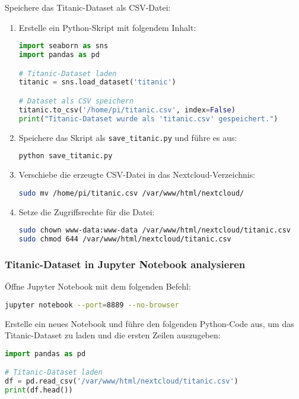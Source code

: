 \documentclass[a4paper,12pt]{article}
\begin{document}
Speichere das Titanic-Dataset als CSV-Datei:
\begin{enumerate}
    \item Erstelle ein Python-Skript mit folgendem Inhalt:
\begin{lstlisting}[language=Python]
import seaborn as sns
import pandas as pd

# Titanic-Dataset laden
titanic = sns.load_dataset('titanic')

# Dataset als CSV speichern
titanic.to_csv('/home/pi/titanic.csv', index=False)
print("Titanic-Dataset wurde als 'titanic.csv' gespeichert.")
\end{lstlisting}

    \item Speichere das Skript als \texttt{save\_titanic.py} und führe es aus:
\begin{lstlisting}[language=bash]
python save_titanic.py
\end{lstlisting}

    \item Verschiebe die erzeugte CSV-Datei in das Nextcloud-Verzeichnis:
\begin{lstlisting}[language=bash]
sudo mv /home/pi/titanic.csv /var/www/html/nextcloud/
\end{lstlisting}

    \item Setze die Zugriffsrechte für die Datei:
\begin{lstlisting}[language=bash]
sudo chown www-data:www-data /var/www/html/nextcloud/titanic.csv
sudo chmod 644 /var/www/html/nextcloud/titanic.csv
\end{lstlisting}
\end{enumerate}

\subsubsection{Titanic-Dataset in Jupyter Notebook analysieren}
Öffne Jupyter Notebook mit dem folgenden Befehl:
\begin{lstlisting}[language=bash]
jupyter notebook --port=8889 --no-browser
\end{lstlisting}

\noindent
Erstelle ein neues Notebook und führe den folgenden Python-Code aus, um das Titanic-Dataset zu laden und die ersten Zeilen auszugeben:
\begin{lstlisting}[language=Python]
import pandas as pd

# Titanic-Dataset laden
df = pd.read_csv('/var/www/html/nextcloud/titanic.csv')
print(df.head())
\end{lstlisting}
\end{document}
